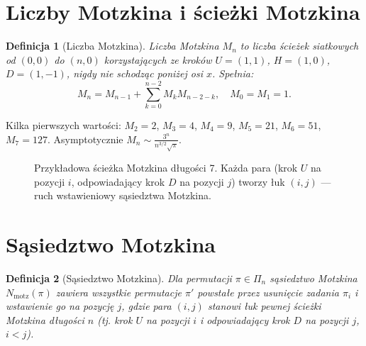 \documentclass[12pt,a4paper]{article}
\newtheorem{definicja}{Definicja}
\begin{document}
\section{Liczby Motzkina i ścieżki Motzkina}

\begin{definicja}[Liczba Motzkina]
Liczba Motzkina $M_n$ to liczba ścieżek siatkowych od $(0,0)$ do $(n,0)$ korzystających ze kroków $U=(1,1)$, $H=(1,0)$, $D=(1,-1)$, nigdy nie schodząc poniżej osi $x$. Spełnia:
\[
M_n = M_{n-1} + \sum_{k=0}^{n-2} M_k M_{n-2-k},\quad M_0 = M_1 = 1.
\]
\end{definicja}

Kilka pierwszych wartości: $M_2=2$, $M_3=4$, $M_4=9$, $M_5=21$, $M_6=51$, $M_7=127$. Asymptotycznie $M_n \sim \frac{3^n}{n^{3/2}\sqrt{\pi}}$.

\begin{figure}[t]
\centering
{}
\caption{Przykładowa ścieżka Motzkina długości 7. Każda para (krok $U$ na pozycji $i$, odpowiadający krok $D$ na pozycji $j$) tworzy łuk $(i,j)$ — ruch wstawieniowy sąsiedztwa Motzkina.}
\label{fig:motzkin_path}
\end{figure}

\section{Sąsiedztwo Motzkina}

\begin{definicja}[Sąsiedztwo Motzkina]
Dla permutacji $\pi \in \Pi_n$ sąsiedztwo Motzkina $N_{\mathrm{motz}}(\pi)$ zawiera wszystkie permutacje $\pi'$ powstałe przez usunięcie zadania $\pi_i$ i wstawienie go na pozycję $j$, gdzie para $(i,j)$ stanowi łuk pewnej ścieżki Motzkina długości $n$ (tj. krok $U$ na pozycji $i$ i odpowiadający krok $D$ na pozycji $j$, $i < j$).
\end{definicja}
\end{document}
